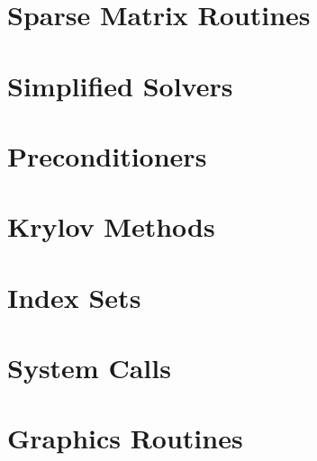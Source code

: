 {\small
\noindent

}

\section{Sparse Matrix Routines}

{\small
\noindent

}

\section{Simplified Solvers}
{\small
\noindent

}

\section{Preconditioners}
{\small
\noindent

}

\section{Krylov Methods}
{\small
\noindent

}

\section{Index Sets}
{\small
\noindent

}

\section{System Calls}
{\small
\noindent

}

\section{Graphics Routines}
{\small
\noindent

}



